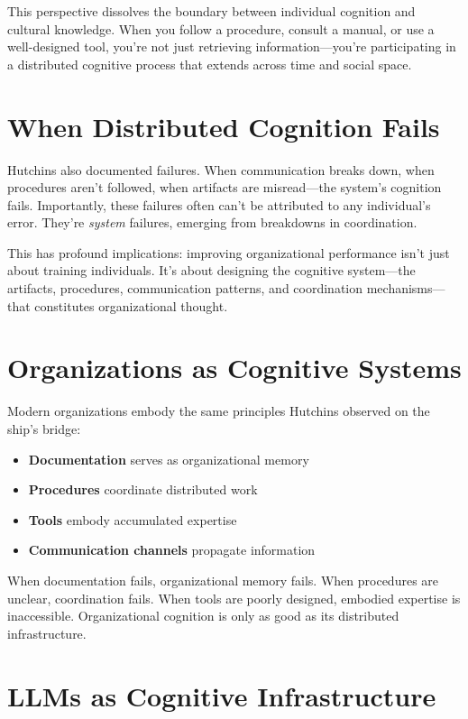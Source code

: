 This perspective dissolves the boundary between individual cognition and cultural knowledge. When you follow a procedure, consult a manual, or use a well-designed tool, you're not just retrieving information---you're participating in a distributed cognitive process that extends across time and social space.

\section{When Distributed Cognition Fails}

Hutchins also documented failures. When communication breaks down, when procedures aren't followed, when artifacts are misread---the system's cognition fails. Importantly, these failures often can't be attributed to any individual's error. They're \emph{system} failures, emerging from breakdowns in coordination.

This has profound implications: improving organizational performance isn't just about training individuals. It's about designing the cognitive system---the artifacts, procedures, communication patterns, and coordination mechanisms---that constitutes organizational thought.

\section{Organizations as Cognitive Systems}

Modern organizations embody the same principles Hutchins observed on the ship's bridge:

\begin{itemize}
    \item \textbf{Documentation} serves as organizational memory
    \item \textbf{Procedures} coordinate distributed work
    \item \textbf{Tools} embody accumulated expertise
    \item \textbf{Communication channels} propagate information
\end{itemize}

When documentation fails, organizational memory fails. When procedures are unclear, coordination fails. When tools are poorly designed, embodied expertise is inaccessible. Organizational cognition is only as good as its distributed infrastructure.

\section{LLMs as Cognitive Infrastructure}

